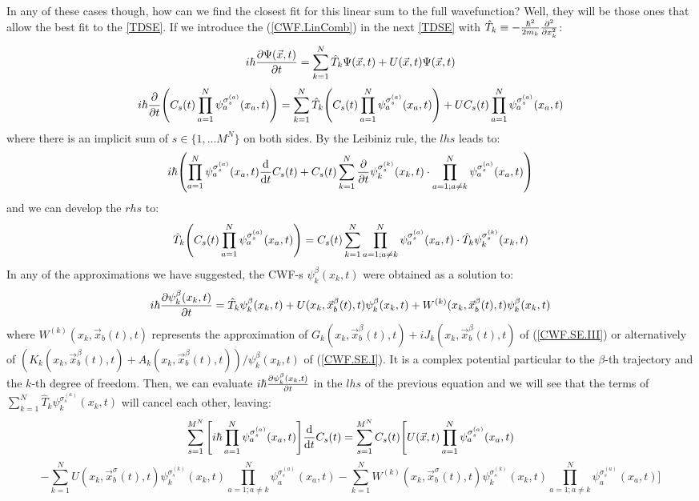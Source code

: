 \documentclass[11pt, a4paper]{article} %
\begin{document}
In any of these cases though, how can we find the closest fit for this linear sum to the full wavefunction? Well, they will be those ones that allow the best fit to the \ref{TDSE}. If we introduce the (\ref{CWF.LinComb}) in the next \ref{TDSE} with $\hat{T}_k\equiv -\frac{\hbar^2}{2m_k}\pdv[2]{}{x_k}$:\vspace{-0.25cm}
$$
i\hbar \pdv{\Psi(\vec{x},t)}{t} = \sum_{k=1}^N \hat{T}_k\Psi(\vec{x},t)+U(\vec{x},t)\Psi(\vec{x},t)
$$
$$
i\hbar \pdv{}{t} \qty(C_s(t)\prod_{a=1}^N \psi_a^{\sigma_s^{(a)}}(x_a,t)) =  \sum_{k=1}^N \hat{T}_k\qty(C_s(t)\prod_{a=1}^N \psi_a^{\sigma_s^{(a)}}(x_a,t))+UC_s(t)\prod_{a=1}^N \psi_a^{\sigma_s^{(a)}}(x_a,t)
$$
where there is an implicit sum of $s\in \{1,...M^N\}$ on both sides. By the Leibiniz rule, the $lhs$ leads to:
$$
i\hbar \qty(\prod_{a=1}^N \psi_a^{\sigma_s^{(a)}}(x_a,t)\dv{}{t}C_s(t)+C_s(t)\sum_{k=1}^N \pdv{}{t}\psi_k^{\sigma_s^{(k)}}(x_k,t)\cdot \prod_{a=1;a\neq k}^N \psi_a^{\sigma_s^{(a)}}(x_a,t) )
$$
and we can develop the $rhs$ to:
$$
\hat{T}_k\qty(C_s(t)\prod_{a=1}^N \psi_a^{\sigma_s^{(a)}}(x_a,t)) = C_s(t)\sum_{k=1}^N \prod_{a=1;a\neq k}^N  \psi_a^{\sigma_s^{(a)}}(x_a,t)  \cdot \hat{T}_k \psi_k^{\sigma_s^{(k)}}(x_k,t) 
$$
In any of the approximations we have suggested, the CWF-s $\psi^\beta_k(x_k,t)$ were obtained as a solution to:\vspace{-0.2cm}
$$
i\hbar \pdv{\psi^\beta_k(x_k,t)}{t} = \hat{T}_k\psi^\beta_k(x_k,t) + U(x_k, \vec{x}^\beta_b(t), t)\psi^\beta_k(x_k,t) + W^{(k)}(x_k, \vec{x}^\beta_{b}(t),t) \psi^\beta_k(x_k,t)
$$
where $ W^{(k)}(x_k, \vec{x}_{b}(t),t)$ represents the approximation of $G_k(x_k,\vec{x}^\beta_b(t),t)+iJ_k(x_k,\vec{x}^\beta_b(t),t)$ of (\ref{CWF.SE.III}) or alternatively of $(K_k(x_k,\vec{x}^\beta_b(t),t)+A_k(x_k,\vec{x}^\beta_b(t),t))/\psi^\beta_k(x_k,t)$ of (\ref{CWF.SE.I}). It is a complex potential particular to the $\beta$-th trajectory and the $k$-th degree of freedom. Then, we can evaluate $i\hbar \pdv{\psi^\beta_k(x_k,t)}{t}$ in the $lhs$ of the previous equation and we will see that the terms of $\sum_{k=1}^N \hat{T}_k \psi^{\sigma_s^{(a)}}_k(x_k,t)$ will cancel each other, leaving:\vspace{-0.2cm}
$$
\sum_{s=1}^{M^N} \qty[i\hbar \prod_{a=1}^N  \psi_a^{\sigma_s^{(a)}}(x_a,t)] \dv{}{t}C_s(t) = \sum_{s=1}^{M^N}C_s(t) \Bigg[ U(\vec{x},t)\prod_{a=1}^N  \psi_a^{\sigma_s^{(a)}}(x_a,t) 
$$
$$
- \sum_{k=1}^N U(x_k,\vec{x}_b^{\sigma}(t),t)\psi_k^{\sigma_s^{(k)}}(x_k,t) \prod_{a=1; a\neq k}^N  \psi_a^{\sigma_s^{(a)}}(x_a,t) -\sum_{k=1}^N W^{(k)}(x_k,\vec{x}_b^{\sigma}(t),t)\psi_k^{\sigma_s^{(k)}}(x_k,t) \prod_{a=1; a\neq k}^N  \psi_a^{\sigma_s^{(a)}}(x_a,t)\Bigg]
$$
\end{document}
